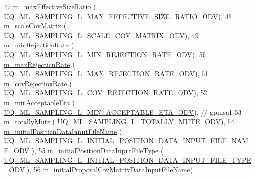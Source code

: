 \begin{DoxyCode}
47   \hyperlink{class_q_u_e_s_o_1_1_m_l_sampling_level_options_a6740534c2a37694cbc3775dbf60619a1}{m\_maxEffectiveSizeRatio}                    (
      \hyperlink{_m_l_sampling_level_options_8h_aab2e192c83f639b28db48cd1325c679f}{UQ\_ML\_SAMPLING\_L\_MAX\_EFFECTIVE\_SIZE\_RATIO\_ODV}),
48   \hyperlink{class_q_u_e_s_o_1_1_m_l_sampling_level_options_ac7deaeedd0deebf8ee14414fa3dbd334}{m\_scaleCovMatrix}                           (
      \hyperlink{_m_l_sampling_level_options_8h_a49cd7dc3037c16cd3e16f1f9669256a4}{UQ\_ML\_SAMPLING\_L\_SCALE\_COV\_MATRIX\_ODV}),
49   \hyperlink{class_q_u_e_s_o_1_1_m_l_sampling_level_options_a6010e1a97f0712b376653819aa6cdbca}{m\_minRejectionRate}                         (
      \hyperlink{_m_l_sampling_level_options_8h_a574579288519b59fa1b95061fb13fe24}{UQ\_ML\_SAMPLING\_L\_MIN\_REJECTION\_RATE\_ODV}),
50   \hyperlink{class_q_u_e_s_o_1_1_m_l_sampling_level_options_ad7ec8ef589c49609d0082d3eb514bb13}{m\_maxRejectionRate}                         (
      \hyperlink{_m_l_sampling_level_options_8h_a81d863ad126843d9b254114a538a1560}{UQ\_ML\_SAMPLING\_L\_MAX\_REJECTION\_RATE\_ODV}),
51   \hyperlink{class_q_u_e_s_o_1_1_m_l_sampling_level_options_a8efaf9dfed7ff9f87c9a40aa8e8217a8}{m\_covRejectionRate}                         (
      \hyperlink{_m_l_sampling_level_options_8h_a4d7492a45d9ebec82d67920f1ffb0498}{UQ\_ML\_SAMPLING\_L\_COV\_REJECTION\_RATE\_ODV}),
52   \hyperlink{class_q_u_e_s_o_1_1_m_l_sampling_level_options_a8230c7dd67833668237d3dc5b19c53c5}{m\_minAcceptableEta}                         (
      \hyperlink{_m_l_sampling_level_options_8h_a7307f24450402725e187c97c1debd7c7}{UQ\_ML\_SAMPLING\_L\_MIN\_ACCEPTABLE\_ETA\_ODV}), \textcolor{comment}{// gpmsa1}
53   \hyperlink{class_q_u_e_s_o_1_1_m_l_sampling_level_options_aeb5b3d634be08ac24bdc008ecfbf08b6}{m\_totallyMute}                              (
      \hyperlink{_m_l_sampling_level_options_8h_a9d1012583b3b71282c1c75c33a191a4f}{UQ\_ML\_SAMPLING\_L\_TOTALLY\_MUTE\_ODV}),
54   \hyperlink{class_q_u_e_s_o_1_1_m_l_sampling_level_options_ac27dd9d3b5a376bfd146caa62fa32613}{m\_initialPositionDataInputFileName}         (
      \hyperlink{_m_l_sampling_level_options_8h_a63a8268271c1542aed8c40f08b3b83bb}{UQ\_ML\_SAMPLING\_L\_INITIAL\_POSITION\_DATA\_INPUT\_FILE\_NAME\_ODV}
      ),
55   \hyperlink{class_q_u_e_s_o_1_1_m_l_sampling_level_options_a582573c99a718b1eefe417c0cccf071f}{m\_initialPositionDataInputFileType}         (
      \hyperlink{_m_l_sampling_level_options_8h_a918e004ed30b6e2832b8ba3adf51cad4}{UQ\_ML\_SAMPLING\_L\_INITIAL\_POSITION\_DATA\_INPUT\_FILE\_TYPE\_ODV}
      ),
56   \hyperlink{class_q_u_e_s_o_1_1_m_l_sampling_level_options_aa2dd58cb7865577da082fde9f0b180cb}{m\_initialProposalCovMatrixDataInputFileName}(

\end{DoxyCode}
